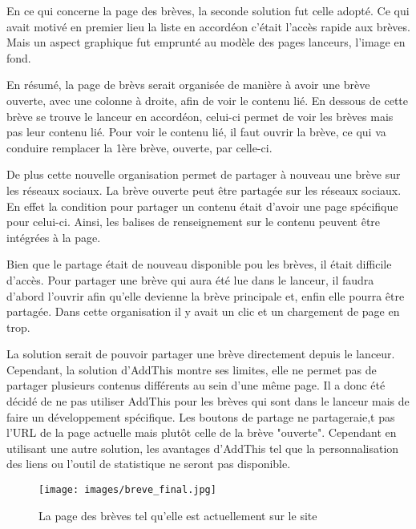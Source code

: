 \documentclass[12pt,a4paper]{article}
\begin{document}
En ce qui concerne la page des brèves, la seconde solution fut celle adopté. Ce qui avait motivé en premier lieu la liste en accordéon c'était l'accès rapide aux brèves. Mais un aspect graphique fut emprunté au modèle des pages lanceurs, l'image en fond.\par 
\medskip
En résumé, la page de brèvs serait organisée de manière à avoir une brève ouverte, avec une colonne à droite, afin de voir le contenu lié. En dessous de cette brève se trouve le lanceur en accordéon, celui-ci permet de voir les brèves mais pas leur contenu lié. Pour voir le contenu lié, il faut ouvrir la brève, ce qui va conduire remplacer la 1ère brève, ouverte, par celle-ci.\par
De plus cette nouvelle organisation permet de partager à nouveau une brève sur les réseaux sociaux. La brève ouverte peut être partagée sur les réseaux sociaux. En effet la condition pour partager un contenu était d'avoir une page spécifique pour celui-ci. Ainsi, les balises de renseignement sur le contenu peuvent être intégrées à la page.\par 
Bien que le partage était de nouveau disponible pou les brèves, il était difficile d'accès. Pour partager une brève qui aura été lue dans le lanceur, il faudra d'abord l'ouvrir afin qu'elle devienne la brève principale et, enfin elle pourra être partagée. Dans cette organisation il y avait un clic et un chargement de page en trop.\par 
La solution serait de pouvoir partager une brève directement depuis le lanceur. Cependant, la solution d'AddThis montre ses limites, elle ne permet pas de partager plusieurs contenus différents au sein d'une même page. Il a donc été décidé de ne pas utiliser AddThis pour les brèves qui sont dans le lanceur mais de faire un développement spécifique. Les boutons de partage ne partageraie,t pas l'URL de la page actuelle mais plutôt celle de la brève "ouverte". Cependant en utilisant une autre solution, les avantages d'AddThis tel que la personnalisation des liens ou l'outil de statistique ne seront pas disponible.\par

\begin{figure}[h!]
\centering\texttt{[image: images/breve\_final.jpg]} 
\caption{La page des brèves tel qu'elle est actuellement sur le site}
\end{figure}
\end{document}
